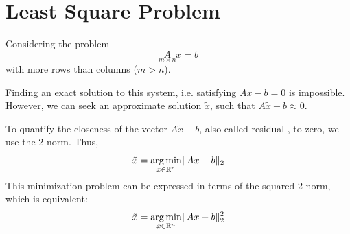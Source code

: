 \documentclass{article}
\begin{document}
\section{Least Square Problem}
Considering the problem 
$$\underset{m\times n}{A}x=b$$
with more rows than columns ($m>n$).

Finding an exact solution to this system, i.e. satisfying $Ax-b=0$ is
impossible. However, we can seek an approximate solution $\tilde{x}$, such
that $A\tilde{x}-b\approx0$.

To quantify the closeness of the vector $A\tilde{x}-b$, also called residual
, to zero, we use the 2-norm. Thus,
$$\tilde{x}=\operatorname*{arg\,min}_{x\in \mathbb{R}^n}\lVert Ax-b\rVert_2$$
This minimization problem can be expressed in terms of the squared 2-norm,
which is equivalent:
$$\tilde{x}=\operatorname*{arg\,min}_{x\in \mathbb{R}^n}\lVert Ax-b\rVert_2^2$$
\end{document}
